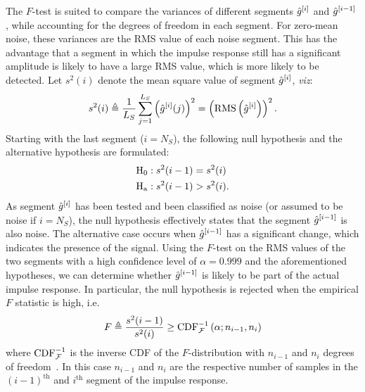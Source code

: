 \begin{enumerate}
  The $F$-test is suited to compare the variances of different segments ${\hat{g}}^{[i]}$ and ${\hat{g}}^{[i-1]}$ \citep{Parsons1974}, while accounting for the degrees of freedom in each segment.
  For zero-mean noise, these variances are the \gls{RMS} value of each noise segment.
  This has the advantage that a segment in which the impulse response still has a significant amplitude is likely to have a large \gls{RMS} value, which is more likely to be detected.
  Let $s^2(i)$ denote the mean square value of segment ${\hat{g}}^{[i]}$, \emph{viz}:
  \begin{equation}
    s^2(i) 
    \triangleq \frac{1}{L_S} \sum_{j=1}^{L_S} \left({\hat{g}}^{[i]}(j)\right)^2
    = \left( \operatorname{RMS} \left( \hat{g}^{[i]} \right) \right)^2
           \text{.}
  \end{equation}
  Starting with the last segment ($i = N_S$), the following null hypothesis and the alternative hypothesis are formulated:
  \begin{align}
     \mathrm{H}_{\mathrm{0}} &: s^2(i-1) = s^2(i)\\
     \mathrm{H}_{\mathrm{a}}    &: s^2(i-1) > s^2(i)
     \text{.}
  \end{align}
  As segment ${\hat{g}}^{[i]}$ has been tested and been classified as noise (or assumed to be noise if $i=N_S$), the null hypothesis effectively states that the segment ${\hat{g}}^{[i-1]}$ is also noise.
  The alternative case occurs when ${\hat{g}}^{[i-1]}$ has a significant change, which indicates the presence of the signal.
  Using the $F$-test on the \gls{RMS} values of the two segments with a high confidence level of $\alpha=0.999$ and the aforementioned hypotheses, we can determine whether ${\hat{g}}^{[i-1]}$ is likely to be part of the actual impulse response.
  In particular, the null hypothesis is rejected when the empirical $F$ statistic is high, i.e.
  \begin{equation}
    F \triangleq \frac{s^2(i-1)}{s^2(i)} \geq \mathrm{CDF}^{-1}_{\operatorname{\mathcal{F}}} \left( \alpha; n_{i-1}, n_{i} \right)
  \end{equation}
  where $ \mathrm{CDF}^{-1}_{\operatorname{\mathcal{F}}}$ is the inverse \gls{CDF} of the \mbox{$F$-distribution} with $n_{i-1}$ and $n_{i}$ degrees of freedom~\citep{EncyclopediaOfMathematics}.
  In this case $n_{i-1}$ and $n_{i}$ are the respective number of samples in the $(i-1)^{\text{th}}$ and $i^{\text{th}}$ segment of the impulse response.


\end{enumerate}
